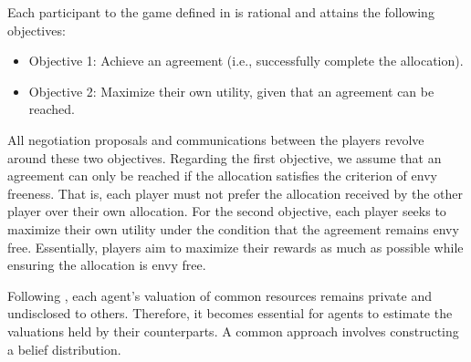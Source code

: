 \begin{assumption}
\label{defn:obj}
Each participant to the game defined in  is rational and attains the following objectives:
\begin{itemize}
    \item Objective 1: Achieve an agreement (i.e., successfully complete the allocation).
    \item Objective 2: Maximize their own utility, given that an agreement can be reached.
\end{itemize}
\end{assumption}

All negotiation proposals and communications between the players revolve around these two objectives. Regarding the first objective, we assume that an agreement can only be reached if the allocation satisfies the criterion of envy freeness. That is, each player must not prefer the allocation received by the other player over their own allocation. For the second objective, each player seeks to maximize their own utility under the condition that the agreement remains envy free. Essentially, players aim to maximize their rewards as much as possible while ensuring the allocation is envy free.




Following , each agent's valuation of common resources remains private and undisclosed to others. Therefore, it becomes essential for agents to estimate the valuations held by their counterparts. A common approach involves constructing a belief distribution.

